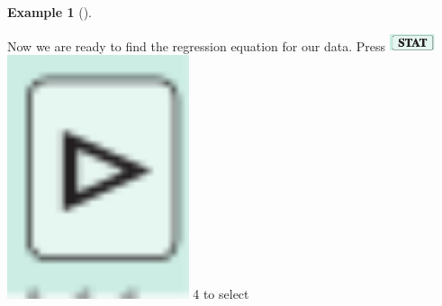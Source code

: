 \documentclass[10pt,]{book}
\theoremstyle{plain}
\theoremstyle{definition}
\theoremstyle{definition}
\newtheorem{example}[theorem]{Example}
\numberwithin{equation}{section}
\begin{document}
\begin{example}[]
\begin{enumerate}[label=*\alph**]
        Now we are ready to find the regression equation for our data. Press \includegraphics[width=0.10\textwidth,]{images/icon-stat.svg}\includegraphics[width=0.4\textwidth,]{images/icon-right.svg} 4 to select
\end{enumerate}
\end{example}
\end{document}
